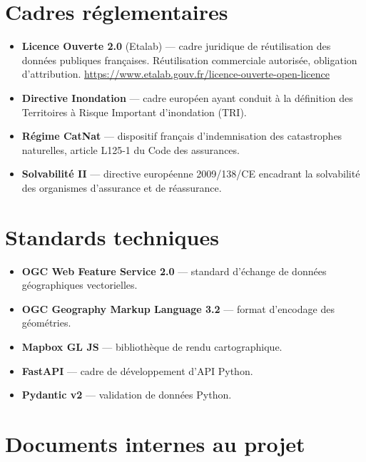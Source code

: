 \section*{Cadres réglementaires}

\begin{itemize}[leftmargin=1.4em]
  \item \textbf{Licence Ouverte 2.0} (Etalab) — cadre juridique de
        réutilisation des données publiques françaises. Réutilisation
        commerciale autorisée, obligation d'attribution.
        \url{https://www.etalab.gouv.fr/licence-ouverte-open-licence}
  \item \textbf{Directive Inondation} — cadre européen ayant conduit à la
        définition des Territoires à Risque Important d'inondation (TRI).
  \item \textbf{Régime CatNat} — dispositif français d'indemnisation des
        catastrophes naturelles, article L125-1 du Code des assurances.
  \item \textbf{Solvabilité II} — directive européenne 2009/138/CE encadrant la
        solvabilité des organismes d'assurance et de réassurance.
\end{itemize}

\section*{Standards techniques}

\begin{itemize}[leftmargin=1.4em]
  \item \textbf{OGC Web Feature Service 2.0} — standard d'échange de données
        géographiques vectorielles.
  \item \textbf{OGC Geography Markup Language 3.2} — format d'encodage des
        géométries.
  \item \textbf{Mapbox GL JS} — bibliothèque de rendu cartographique.
  \item \textbf{FastAPI} — cadre de développement d'API Python.
  \item \textbf{Pydantic v2} — validation de données Python.
\end{itemize}

\section*{Documents internes au projet}

